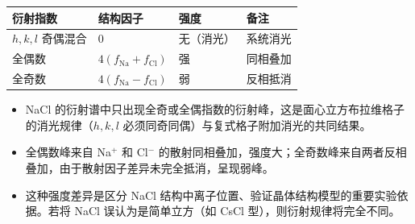 \begin{formulabox}[答案汇总]
\begin{center}
\begin{tabular}{llll}
\toprule
\textbf{衍射指数} & \textbf{结构因子} & \textbf{强度} & \textbf{备注} \\
\midrule
$h,k,l$ 奇偶混合 & $0$ & 无（消光） & 系统消光 \\
全偶数 & $4(f_{\text{Na}}+f_{\text{Cl}})$ & 强 & 同相叠加 \\
全奇数 & $4(f_{\text{Na}}-f_{\text{Cl}})$ & 弱 & 反相抵消 \\
\bottomrule
\end{tabular}
\end{center}
\end{formulabox}

\begin{insightbox}[物理图像]
\begin{itemize}
    \item NaCl 的衍射谱中只出现全奇或全偶指数的衍射峰，这是面心立方布拉维格子的消光规律（$h,k,l$ 必须同奇同偶）与复式格子附加消光的共同结果。
    \item 全偶数峰来自 Na$^+$ 和 Cl$^-$ 的散射同相叠加，强度大；全奇数峰来自两者反相叠加，由于散射因子差异未完全抵消，呈现弱峰。
    \item 这种强度差异是区分 NaCl 结构中离子位置、验证晶体结构模型的重要实验依据。若将 NaCl 误认为是简单立方（如 CsCl 型），则衍射规律将完全不同。
\end{itemize}
\end{insightbox}
